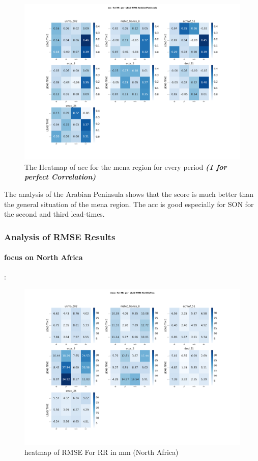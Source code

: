 \begin{figure}[H]
	\centering
	\includegraphics[scale=0.25]{plots/det/acc/acc_RR_ArabianPeninsula.png}
	\caption{The Heatmap of acc for the mena region for every period \textbf{\textit{(1 for perfect Correlation)} }}
\end{figure}

The analysis of the Arabian Peninsula shows that the score is much better than the general situation of the mena region. The acc is good especially for SON for the second and third lead-times.
\subsubsection{Analysis of RMSE Results}

\vspace{1.5cm}

\paragraph{focus on North Africa} : 
\begin{figure}[H]
\centering
\includegraphics[scale=0.3]{plots/det/rmse/rmse_RR_NorthAfrica.png}
\caption{heatmap of RMSE For RR in mm (North Africa)}
\end{figure}


